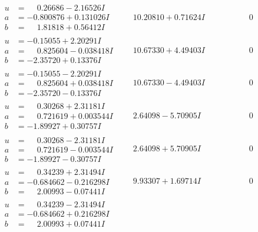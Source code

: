 \documentclass[1p]{elsarticle_modified}
\theoremstyle{definition}
\begin{document}
$$\begin{array}{c|c|c}
\begin{aligned}
u &= \phantom{-}0.26686 - 2.16526 I \\
a &= -0.800876 + 0.131026 I \\
b &= \phantom{-}1.81818 + 0.56412 I\end{aligned}
 & \phantom{-}10.20810 + 0.71624 I & \phantom{-0.000000 } 0 \\ \hline\begin{aligned}
u &= -0.15055 + 2.20291 I \\
a &= \phantom{-}0.825604 - 0.038418 I \\
b &= -2.35720 + 0.13376 I\end{aligned}
 & \phantom{-}10.67330 + 4.49403 I & \phantom{-0.000000 } 0 \\ \hline\begin{aligned}
u &= -0.15055 - 2.20291 I \\
a &= \phantom{-}0.825604 + 0.038418 I \\
b &= -2.35720 - 0.13376 I\end{aligned}
 & \phantom{-}10.67330 - 4.49403 I & \phantom{-0.000000 } 0 \\ \hline\begin{aligned}
u &= \phantom{-}0.30268 + 2.31181 I \\
a &= \phantom{-}0.721619 + 0.003544 I \\
b &= -1.89927 + 0.30757 I\end{aligned}
 & \phantom{-}2.64098 - 5.70905 I & \phantom{-0.000000 } 0 \\ \hline\begin{aligned}
u &= \phantom{-}0.30268 - 2.31181 I \\
a &= \phantom{-}0.721619 - 0.003544 I \\
b &= -1.89927 - 0.30757 I\end{aligned}
 & \phantom{-}2.64098 + 5.70905 I & \phantom{-0.000000 } 0 \\ \hline\begin{aligned}
u &= \phantom{-}0.34239 + 2.31494 I \\
a &= -0.684662 - 0.216298 I \\
b &= \phantom{-}2.00993 - 0.07441 I\end{aligned}
 & \phantom{-}9.93307 + 1.69714 I & \phantom{-0.000000 } 0 \\ \hline\begin{aligned}
u &= \phantom{-}0.34239 - 2.31494 I \\
a &= -0.684662 + 0.216298 I \\
b &= \phantom{-}2.00993 + 0.07441 I\end{aligned}

\end{array}$$
\end{document}
